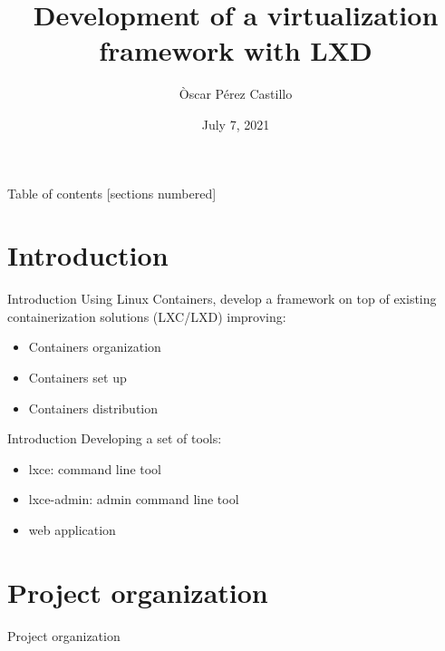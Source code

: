 \documentclass[10pt,english,handout,aspectradio=169]{beamer}
\title{Development of a virtualization framework with LXD}
\date{July 7, 2021}
\author{Òscar Pérez Castillo}
\institute{Universitat Politècnica de Catalunya}
\begin{document}
\maketitle

\begin{frame}{Table of contents}
  [sections numbered]
  \tableofcontents[hideallsubsections]
\end{frame}

\section{Introduction}
\begin{frame}{Introduction}
   Using Linux Containers, develop a framework on top of existing containerization solutions (LXC/LXD) improving:
   \begin{itemize}
       \item Containers organization
       \item Containers set up
       \item Containers distribution
   \end{itemize}
\end{frame}
\begin{frame}{Introduction}
    Developing a set of tools:
   \begin{itemize}
       \item lxce: command line tool
       \item lxce-admin: admin command line tool
       \item web application
   \end{itemize}
\end{frame}

\section{Project organization}
\begin{frame}{Project organization}
\resizebox{10cm}{!}{}
\end{frame}



\end{document}
